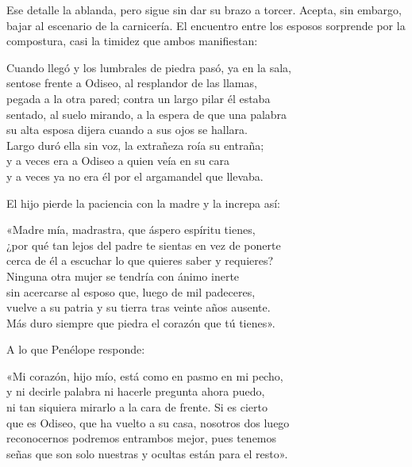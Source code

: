 Ese detalle la ablanda, pero sigue sin dar su brazo a torcer. Acepta, sin embargo, bajar al escenario de la carnicería. El encuentro entre los esposos sorprende por la compostura, casi la timidez que ambos manifiestan:

\begin{versocita}
Cuando llegó y los lumbrales de piedra pasó, ya en la sala,\\
sentose frente a Odiseo, al resplandor de las llamas,\\
pegada a la otra pared; contra un largo pilar él estaba\\
sentado, al suelo mirando, a la espera de que una palabra\\
su alta esposa dijera cuando a sus ojos se hallara.\\
Largo duró ella sin voz, la extrañeza roía su entraña;\\
y a veces era a Odiseo a quien veía en su cara\\
y a veces ya no era él por el argamandel que llevaba.
\end{versocita}

El hijo pierde la paciencia con la madre y la increpa así:

\begin{versocita}
«Madre mía, madrastra, que áspero espíritu tienes,\\
¿por qué tan lejos del padre te sientas en vez de ponerte\\
cerca de él a escuchar lo que quieres saber y requieres?\\
Ninguna otra mujer se tendría con ánimo inerte\\
sin acercarse al esposo que, luego de mil padeceres,\\
vuelve a su patria y su tierra tras veinte años ausente.\\
Más duro siempre que piedra el corazón que tú tienes».
\end{versocita}

A lo que Penélope responde:

\begin{versocita}
«Mi corazón, hijo mío, está como en pasmo en mi pecho,\\
y ni decirle palabra ni hacerle pregunta ahora puedo,\\
ni tan siquiera mirarlo a la cara de frente. Si es cierto\\
que es Odiseo, que ha vuelto a su casa, nosotros dos luego\\
reconocernos podremos entrambos mejor, pues tenemos\\
señas que son solo nuestras y ocultas están para el resto».
\end{versocita}

